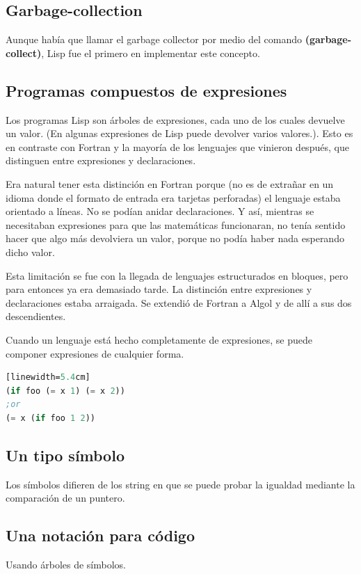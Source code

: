\documentclass[10pt,journal,compsoc]{IEEEtran}
\begin{document}
\subsection{Garbage-collection}
Aunque hab\'ia que llamar el garbage collector por medio del comando \textbf{(garbage-collect)}, Lisp fue el primero en implementar este concepto.

\subsection{Programas compuestos de expresiones}
Los programas Lisp son \'arboles de expresiones, cada uno de los cuales devuelve un valor. (En algunas expresiones de Lisp puede devolver varios valores.). Esto es en contraste con Fortran y la mayor\'ia de los lenguajes que vinieron despu\'es, que distinguen entre expresiones y declaraciones.

Era natural tener esta distinci\'on en Fortran porque (no es de extra\~nar en un idioma donde el formato de entrada era tarjetas perforadas) el lenguaje estaba orientado a l\'ineas. No se pod\'ian anidar declaraciones. Y as\'i, mientras se necesitaban expresiones para que las matem\'aticas funcionaran, no ten\'ia sentido hacer que algo m\'as devolviera un valor, porque no pod\'ia haber nada esperando dicho valor.

Esta limitaci\'on se fue con la llegada de lenguajes estructurados en bloques, pero para entonces ya era demasiado tarde. La distinci\'on entre expresiones y declaraciones estaba arraigada. Se extendi\'o de Fortran a Algol y de all\'i a sus dos descendientes.

Cuando un lenguaje est\'a hecho completamente de expresiones, se puede componer expresiones de cualquier forma.

\begin{lstlisting}[language=Lisp, caption = {Dos maneras de escribir la misma expresi\'on en Lisp}][linewidth=5.4cm]
(if foo (= x 1) (= x 2))
;or
(= x (if foo 1 2))
\end{lstlisting}

\subsection{Un tipo s\'imbolo}
Los s\'imbolos difieren de los string en que se puede probar la igualdad mediante la comparaci\'on de un puntero.

\subsection{Una notaci\'on para c\'odigo}
Usando \'arboles de s\'imbolos.
\end{document}

